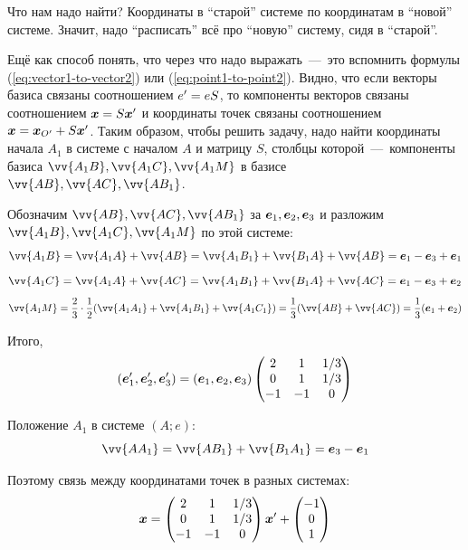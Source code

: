 \documentclass[a4paper,12pt]{article}
\begin{document}
  \begin{solution}
    Что нам надо найти?
    Координаты в ``старой'' системе по координатам в ``новой'' системе.
    Значит, надо ``расписать'' всё про ``новую'' систему, сидя в ``старой''.
    
    Ещё как способ понять, что через что надо выражать~---~это вспомнить формулы (\ref{eq:vector1-to-vector2}) или (\ref{eq:point1-to-point2}).
    Видно, что если векторы базиса связаны соотношением $e' \hm= e S$, то компоненты векторов связаны соотношением $\bds x \hm= S \bds x'$ и координаты точек связаны соотношением $\bds x \hm= \bds x_{O'} \hm+ S \bds x'$.
    Таким образом, чтобы решить задачу, надо найти координаты начала $A_1$ в системе с началом $A$ и матрицу $S$, столбцы которой~---~компоненты базиса $\vv{A_1 B}, \vv{A_1 C}, \vv{A_1 M}$ в базисе $\vv{AB}, \vv{AC}, \vv{AB_1}$.
    
    Обозначим $\vv{AB}, \vv{AC}, \vv{AB_1}$ за $\boldsymbol e_1, \boldsymbol e_2, \boldsymbol e_3$ и разложим $\vv{A_1 B}, \vv{A_1 C}, \vv{A_1 M}$ по этой системе:
    \[
      \vv{A_1 B} = \vv{A_1 A} + \vv{AB} = \vv{A_1 B_1} + \vv{B_1 A} + \vv{AB} = \bds e_1 - \bds e_3 + \bds e_1
    \]
    \[
      \vv{A_1 C} = \vv{A_1 A} + \vv{AC} = \vv{A_1 B_1} + \vv{B_1 A} + \vv{AC} = \bds e_1 - \bds e_3 + \bds e_2
    \]
    \[
      \vv{A_1 M} = \frac{2}{3} \cdot \frac{1}{2} (\vv{A_1 A_1} + \vv{A_1 B_1} + \vv{A_1 C_1}) = \frac{1}{3} (\vv{AB} + \vv{AC})
        = \frac{1}{3} (\bds e_1 + \bds e_2)
    \]
    
    Итого,
    \[
      (\boldsymbol e_1', \boldsymbol e_2', \boldsymbol e_3') = (\boldsymbol e_1, \boldsymbol e_2, \boldsymbol e_3) \begin{pmatrix}
        2 & 1 & 1/3\\
        0 & 1 & 1/3\\
        -1 & -1 & 0
      \end{pmatrix}
    \]
    
    Положение $A_1$ в системе $(A; e)$:
    \[
      \vv{AA_1} = \vv{AB_1} + \vv{B_1 A_1} = \bds e_3 - \bds e_1
    \]
    
    Поэтому связь между координатами точек в разных системах:
    \[
      \boldsymbol x = \begin{pmatrix}
        2 & 1 & 1/3\\
        0 & 1 & 1/3\\
        -1 & -1 & 0
      \end{pmatrix} \boldsymbol x'
      + \begin{pmatrix}
        -1\\
        0\\
        1
      \end{pmatrix}
    \]
  \end{solution}
  
\end{document}
